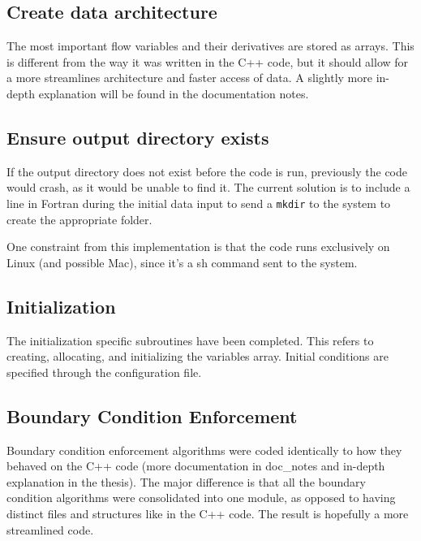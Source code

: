 \documentclass[12pt]{article}
\begin{document}
    \subsection{Create data architecture}
    The most important flow variables and their derivatives are stored as arrays. This is different from the way it was written in the C++ code, but it should allow for a more streamlines architecture and faster access of data. A slightly more in-depth explanation will be found in the documentation notes.

    \subsection{Ensure output directory exists}
    If the output directory does not exist before the code is run, previously the code would crash, as it would be unable to find it. The current solution is to include a line in Fortran during the initial data input to send a \texttt{mkdir} to the system to create the appropriate folder.

    One constraint from this implementation is that the code runs exclusively on Linux (and possible Mac), since it's a sh command sent to the system.

    \subsection{Initialization}
    The initialization specific subroutines have been completed. This refers to creating, allocating, and initializing the variables array. Initial conditions are specified through the configuration file.

    \subsection{Boundary Condition Enforcement}
    Boundary condition enforcement algorithms were coded identically to how they behaved on the C++ code (more documentation in doc\_notes and in-depth explanation in the thesis). The major difference is that all the boundary condition algorithms were consolidated into one module, as opposed to having distinct files and structures like in the C++ code. The result is hopefully a more streamlined code.
\end{document}
